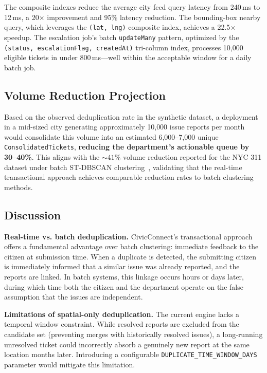 \documentclass[conference]{IEEEtran}
\begin{document}
The composite indexes reduce the average city feed query latency from 240\,ms to 12\,ms, a 20$\times$ improvement and 95\% latency reduction. The bounding-box nearby query, which leverages the \texttt{(lat, lng)} composite index, achieves a 22.5$\times$ speedup. The escalation job's batch \texttt{updateMany} pattern, optimized by the \texttt{(status, escalationFlag, createdAt)} tri-column index, processes 10{,}000 eligible tickets in under 800\,ms---well within the acceptable window for a daily batch job.

\subsection{Volume Reduction Projection}

Based on the observed deduplication rate in the synthetic dataset, a deployment in a mid-sized city generating approximately 10{,}000 issue reports per month would consolidate this volume into an estimated 6{,}000--7{,}000 unique \texttt{ConsolidatedTickets}, \textbf{reducing the department's actionable queue by 30--40\%}. This aligns with the ${\sim}41\%$ volume reduction reported for the NYC 311 dataset under batch ST-DBSCAN clustering~\cite{b4}, validating that the real-time transactional approach achieves comparable reduction rates to batch clustering methods.

\subsection{Discussion}

\textbf{Real-time vs. batch deduplication.} CivicConnect's transactional approach offers a fundamental advantage over batch clustering: immediate feedback to the citizen at submission time. When a duplicate is detected, the submitting citizen is immediately informed that a similar issue was already reported, and the reports are linked. In batch systems, this linkage occurs hours or days later, during which time both the citizen and the department operate on the false assumption that the issues are independent.

\textbf{Limitations of spatial-only deduplication.} The current engine lacks a temporal window constraint. While resolved reports are excluded from the candidate set (preventing merges with historically resolved issues), a long-running unresolved ticket could incorrectly absorb a genuinely new report at the same location months later. Introducing a configurable \texttt{DUPLICATE\_TIME\_WINDOW\_DAYS} parameter would mitigate this limitation.
\end{document}
